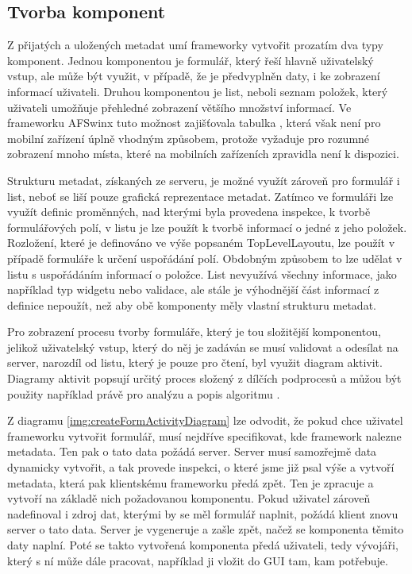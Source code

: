 \subsection{Tvorba komponent}
Z přijatých a uložených metadat umí frameworky vytvořit prozatím dva typy komponent. Jednou komponentou je formulář, který řeší hlavně uživatelský vstup, ale může být využit, v případě, že je předvyplněn daty, i ke zobrazení informací uživateli. Druhou komponentou je list, neboli seznam položek, který uživateli umožňuje přehledné zobrazení většího množství informací. Ve frameworku AFSwinx tuto možnost zajišťovala tabulka \cite{tomasek-thesis}, která však není pro mobilní zařízení úplně vhodným způsobem, protože vyžaduje pro rozumné zobrazení mnoho místa, které na mobilních zařízeních zpravidla není k dispozici.

Strukturu metadat, získaných ze serveru, je možné využít zároveň pro formulář i list, neboť se liší pouze grafická reprezentace metadat. Zatímco ve formuláři lze využít definic proměnných, nad kterými byla provedena inspekce, k tvorbě formulářových polí, v listu je lze použít k tvorbě informací o jedné z jeho položek. Rozložení, které je definováno ve výše popsaném TopLevelLayoutu, lze použít v případě formuláře k určení uspořádání polí. Obdobným způsobem to lze udělat v listu s uspořádáním informací o položce. List nevyužívá všechny informace, jako například typ widgetu nebo validace, ale stále je výhodnější část informací z definice nepoužít, než aby obě komponenty měly vlastní strukturu metadat. 

Pro zobrazení procesu tvorby formuláře, který je tou složitější komponentou, jelikož uživatelský vstup, který do něj je zadáván se musí validovat a odesílat na server, narozdíl od listu, který je pouze pro čtení, byl využit diagram aktivit. Diagramy aktivit popsují určitý proces složený z dílčích podprocesů a můžou být použity například právě pro analýzu a popis algoritmu \cite{UmlArlow}. 

Z diagramu \ref{img:createFormActivityDiagram} lze odvodit, že pokud chce uživatel frameworku vytvořit formulář, musí nejdříve specifikovat, kde framework nalezne metadata. Ten pak o tato data požádá server. Server musí samozřejmě data dynamicky vytvořit, a tak provede inspekci, o které jsme již psal výše a vytvoří metadata, která pak klientskému frameworku předá zpět. Ten je zpracuje a vytvoří na základě nich požadovanou komponentu. Pokud uživatel zároveň nadefinoval i zdroj dat, kterými by se měl formulář naplnit, požádá klient znovu server o tato data. Server je vygeneruje a zašle zpět, načež se komponenta těmito daty naplní. Poté se takto vytvořená komponenta předá uživateli, tedy vývojáři, který s ní může dále pracovat, například ji vložit do GUI tam, kam potřebuje.

